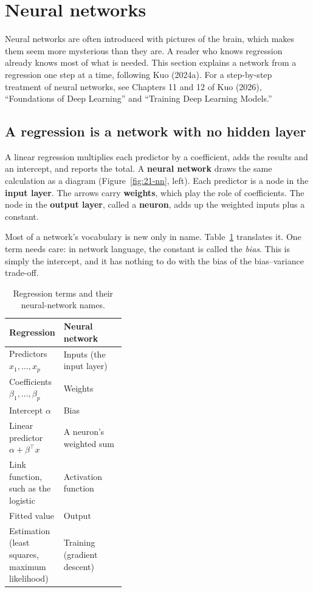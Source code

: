 \section{Neural networks}
\label{sec:21-nn}


Neural networks are often introduced with pictures of the brain, which makes them seem more mysterious than they are. A reader who knows regression already knows most of what is needed. This section explains a network from a regression one step at a time, following Kuo (2024a). For a step-by-step treatment of neural networks, see Chapters 11 and 12 of Kuo (2026), ``Foundations of Deep Learning'' and ``Training Deep Learning Models.''

\subsection{A regression is a network with no hidden layer}

A linear regression multiplies each predictor by a coefficient, adds the results and an intercept, and reports the total. A \textbf{neural network} draws the same calculation as a diagram (Figure~\ref{fig:21-nn}, left). Each predictor is a node in the \textbf{input layer}. The arrows carry \textbf{weights}, which play the role of coefficients. The node in the \textbf{output layer}, called a \textbf{neuron}, adds up the weighted inputs plus a constant.

Most of a network's vocabulary is new only in name. Table~\ref{tab:21-nnterms} translates it. One term needs care: in network language, the constant is called the \emph{bias}. This is simply the intercept, and it has nothing to do with the bias of the bias--variance trade-off.

\begin{table}[htbp]
\centering
\small
\caption{Regression terms and their neural-network names.}
\label{tab:21-nnterms}
\begin{tabularx}{0.85\linewidth}{@{}>{\raggedright\arraybackslash}p{0.38\linewidth}>{\raggedright\arraybackslash}X@{}}
\toprule
Regression & Neural network \\
\midrule
Predictors $x_1, \dots, x_p$ & Inputs (the input layer) \\
Coefficients $\beta_1, \dots, \beta_p$ & Weights \\
Intercept $\alpha$ & Bias \\
Linear predictor $\alpha + \beta^{\top}x$ & A neuron's weighted sum \\
Link function, such as the logistic & Activation function \\
Fitted value & Output \\
Estimation (least squares, maximum likelihood) & Training (gradient descent) \\
\bottomrule
\end{tabularx}
\end{table}

